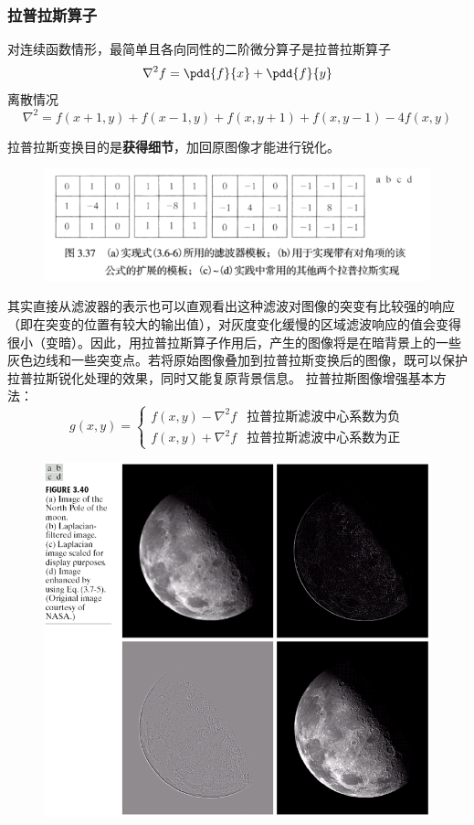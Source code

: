 \subsubsection{拉普拉斯算子}
\begin{definition}
对连续函数情形，最简单且各向同性的二阶微分算子是拉普拉斯算子
\[\nabla^2 f=\pdd{f}{x}+\pdd{f}{y}\]
离散情况
\[\nabla^2=f(x+1,y)+f(x-1,y)+f(x,y+1)+f(x,y-1)-4f(x,y)\]
\end{definition}
拉普拉斯变换目的是\textbf{获得细节}，加回原图像才能进行锐化。
\begin{figure}[H]
\centering
\includegraphics[width=0.6\linewidth]{fig/laplacian_mask.png}
\end{figure}

其实直接从滤波器的表示也可以直观看出这种滤波对图像的突变有比较强的响应（即在突变的位置有较大的输出值），对灰度变化缓慢的区域滤波响应的值会变得很小（变暗）。因此，用拉普拉斯算子作用后，产生的图像将是在暗背景上的一些灰色边线和一些突变点。若将原始图像叠加到拉普拉斯变换后的图像，既可以保护拉普拉斯锐化处理的效果，同时又能复原背景信息。 
拉普拉斯图像增强基本方法：
\[g(x,y)=\begin{cases}
f(x,y)-\nabla^2f & \text{拉普拉斯滤波中心系数为负}\\
f(x,y)+\nabla^2f & \text{拉普拉斯滤波中心系数为正}
\end{cases}\]
\begin{figure}[H]
\centering
\includegraphics[width=0.6\linewidth]{fig/Laplacian.png}
\end{figure}

